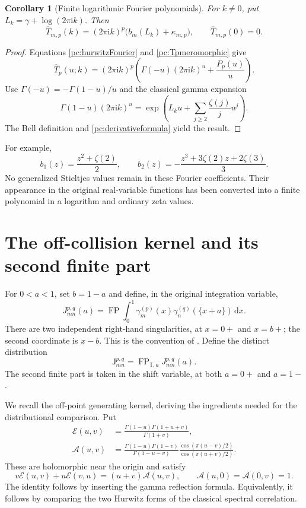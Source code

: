 \documentclass[11pt,a4paper]{article}
\numberwithin{equation}{section}
\newtheorem{corollary}[theorem]{Corollary}
\theoremstyle{definition}
\newcommand{\T}{\mathbb T}
\newcommand{\dd}{\,\mathrm dx}
\newcommand{\ii}{\mathrm i}
\newcommand{\FP}{\operatorname{FP}}
\newcommand{\Jf}{\mathsf J}
\newcommand{\Af}{\mathcal A}
\newcommand{\Ef}{\mathcal E}
\begin{document}
\begin{corollary}[Finite logarithmic Fourier polynomials]\label{pc:fourier}
For $k\ne0$, put $L_k=\gamma+\log(2\pi\ii k)$. Then
\begin{equation}\label{pc:Tfourier}
 \widehat T_{m,p}(k)=(2\pi\ii k)^p\bigl(b_m(L_k)+\kappa_{m,p}\bigr),
 \qquad\widehat T_{m,p}(0)=0.
\end{equation}
\end{corollary}
\begin{proof}
Equations \eqref{pc:hurwitzFourier} and \eqref{pc:Tpmeromorphic} give
\[
 \widehat T_p(u;k)=(2\pi\ii k)^p
 \left(\Gamma(-u)(2\pi\ii k)^u+\frac{P_p(u)}u\right).
\]
Use $\Gamma(-u)=-\Gamma(1-u)/u$ and the classical gamma expansion \cite{pc:DLMFgamma}
\[
 \Gamma(1-u)(2\pi\ii k)^u
 =\exp\left(L_ku+\sum_{j\ge2}\frac{\zeta(j)}j u^j\right).
\]
The Bell definition and \eqref{pc:derivativeformula} yield the result.
\end{proof}
For example,
\[
 b_1(z)=\frac{z^2+\zeta(2)}2,\qquad
 b_2(z)=-\frac{z^3+3\zeta(2)z+2\zeta(3)}3.
\]
No generalized Stieltjes values remain in these Fourier coefficients. Their appearance in the original real-variable functions has been converted into a finite polynomial in a logarithm and ordinary zeta values.

\section{The off-collision kernel and its second finite part}\label{pc:offpoint}
For $0<a<1$, set $b=1-a$ and define, in the original integration variable,
\begin{equation}\label{pc:Jpoint}
 J_{mn}^{p,q}(a)=\FP\int_0^1
 \gamma_m^{(p)}(x)\gamma_n^{(q)}(\{x+a\})\dd.
\end{equation}
There are two independent right-hand singularities, at $x=0+$ and $x=b+$; the second coordinate is $x-b$. This is the convention of \cite{pc:coincident}. Define the distinct distribution
\begin{equation}\label{pc:Jdistribution}
 \Jf_{mn}^{p,q}=\FP_{\T,a}J_{mn}^{p,q}(a).
\end{equation}
The second finite part is taken in the shift variable, at both $a=0+$ and $a=1-$.

We recall the off-point generating kernel, deriving the ingredients needed for the distributional comparison. Put
\begin{align}
 \Ef(u,v)&=\frac{\Gamma(1-u)\Gamma(1+u+v)}{\Gamma(1+v)},\label{pc:E}\\
 \Af(u,v)&=\frac{\Gamma(1-u)\Gamma(1-v)}{\Gamma(1-u-v)}
 \frac{\cos(\pi(u-v)/2)}{\cos(\pi(u+v)/2)}.\label{pc:A}
\end{align}
These are holomorphic near the origin and satisfy
\begin{equation}\label{pc:EA}
 v\Ef(u,v)+u\Ef(v,u)=(u+v)\Af(u,v),\qquad
 \Af(u,0)=\Af(0,v)=1.
\end{equation}
The identity follows by inserting the gamma reflection formula. Equivalently, it follows by comparing the two Hurwitz forms of the classical spectral correlation.
\end{document}
